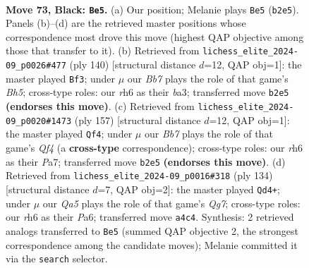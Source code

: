 \documentclass[11pt]{article}
\begin{document}
\clearpage

\begin{figure}[p]\centering
\begin{subfigure}{0.46\textwidth}\centering
\resizebox{\linewidth}{!}{%
\newchessgame
\chessboard[
  setfen={8/8/7R/8/q7/1p1k1B2/1b6/4K3 b - - 3 73},
  showmover=false,
  pgfstyle=straightmove, color=movearrow, markmove={b2-e5}
]}
\caption{}
\end{subfigure}\hfill
\begin{subfigure}{0.46\textwidth}\centering
\resizebox{\linewidth}{!}{%
\newchessgame
\chessboard[
  setfen={8/6k1/8/7B/7P/b6K/8/8 w - - 1 71},
  showmover=false,
  pgfstyle=straightmove, color=movearrow, markmove={h5-f3}
]}
\caption{}
\end{subfigure}
\\[4pt]
\begin{subfigure}{0.46\textwidth}\centering
\resizebox{\linewidth}{!}{%
\newchessgame
\chessboard[
  setfen={8/p4p2/8/5q2/8/2k5/4K3/8 b - - 7 79},
  showmover=false,
  pgfstyle=straightmove, color=movearrow, markmove={f5-f4}
]}
\caption{}
\end{subfigure}\hfill
\begin{subfigure}{0.46\textwidth}\centering
\resizebox{\linewidth}{!}{%
\newchessgame
\chessboard[
  setfen={8/5PQ1/P7/3K4/1b3k2/8/8/8 w - - 1 68},
  showmover=false,
  pgfstyle=straightmove, color=movearrow, markmove={g7-d4}
]}
\caption{}
\end{subfigure}
\caption{\textbf{Move 73, Black: \texttt{Be5}.} (a) Our position; Melanie plays \texttt{Be5} (\texttt{b2e5}). Panels (b)--(d) are the retrieved master positions whose correspondence most drove this move (highest QAP objective among those that transfer to it). (b) Retrieved from \texttt{lichess\_elite\_2024-09\_p0026\#477} (ply 140) [structural distance $d$=12, QAP obj=1]: the master played \texttt{Bf3}; under $\mu$ our \emph{Bb7} plays the role of that game's \emph{Bh5}; cross-type roles: our \emph{r}h6 as their \emph{b}a3; transferred move \texttt{b2e5} \textbf{(endorses this move)}. (c) Retrieved from \texttt{lichess\_elite\_2024-09\_p0020\#1473} (ply 157) [structural distance $d$=12, QAP obj=1]: the master played \texttt{Qf4}; under $\mu$ our \emph{Bb7} plays the role of that game's \emph{Qf4} (a \textbf{cross-type} correspondence); cross-type roles: our \emph{r}h6 as their \emph{P}a7; transferred move \texttt{b2e5} \textbf{(endorses this move)}. (d) Retrieved from \texttt{lichess\_elite\_2024-09\_p0016\#318} (ply 134) [structural distance $d$=7, QAP obj=2]: the master played \texttt{Qd4+}; under $\mu$ our \emph{Qa5} plays the role of that game's \emph{Qg7}; cross-type roles: our \emph{r}h6 as their \emph{P}a6; transferred move \texttt{a4c4}. Synthesis: 2 retrieved analogs transferred to \texttt{Be5} (summed QAP objective 2, the strongest correspondence among the candidate moves); Melanie committed it via the \texttt{search} selector.}
\label{fig:thought-m145}
\end{figure}
\end{document}

